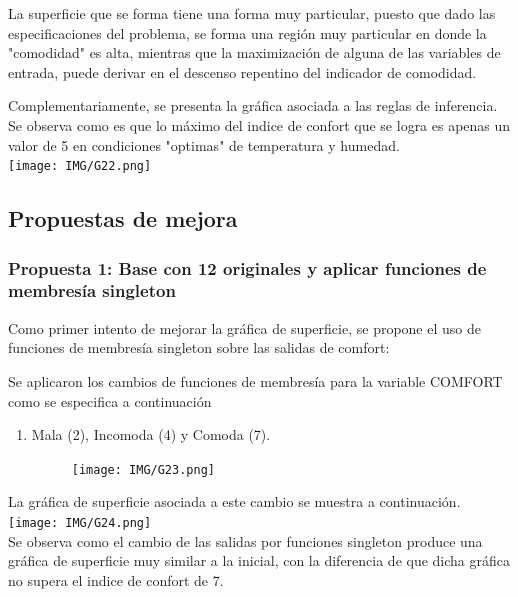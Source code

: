 \documentclass[11pt, letterpaper]{article}
\begin{document}
	La superficie que se forma tiene una forma muy particular, puesto que dado las especificaciones del problema, se forma una región muy particular en donde la "comodidad" es alta, mientras que la maximización de alguna de las variables de entrada, puede derivar en el descenso repentino del indicador de comodidad.
	
	\newpage
	
	Complementariamente, se presenta la gráfica asociada a las reglas de inferencia. Se observa como es que lo máximo del indice de confort que se logra es apenas un valor de 5 en condiciones "optimas" de temperatura y humedad.\\
	
	
	\texttt{[image: IMG/G22.png]}
	
	
	
	
	\newpage
	
	\subsection{Propuestas de mejora}
	
	\subsubsection{Propuesta 1: Base con 12 originales y aplicar funciones de membresía singleton}
	
	Como primer intento de mejorar la gráfica de superficie, se propone el uso de funciones de membresía singleton sobre las salidas de comfort:
	
	Se aplicaron los cambios de funciones de membresía para la variable COMFORT como se especifica a continuación
	
	\begin{enumerate}
		\item Mala (2), Incomoda (4) y Comoda (7).
		\begin{figure}[h]
			\centering
			\texttt{[image: IMG/G23.png]}
		\end{figure}
	\end{enumerate}
	
	
	\newpage 
	
	La gráfica de superficie asociada a este cambio se muestra a continuación. \\
	
	
	\texttt{[image: IMG/G24.png]} \\
	
	Se observa como el cambio de las salidas por funciones singleton produce una gráfica de superficie muy similar a la inicial, con la diferencia de que dicha gráfica no supera el indice de confort de 7. \\
	
\end{document}
